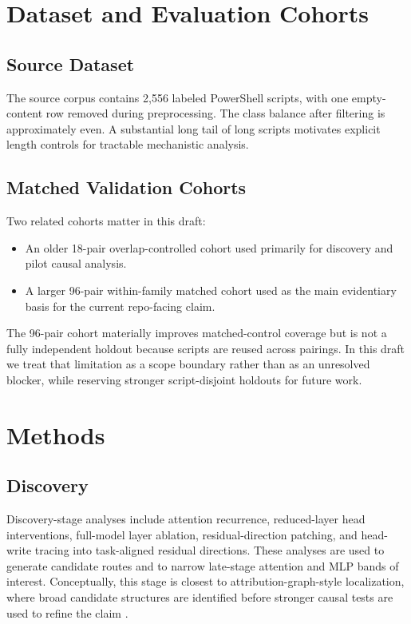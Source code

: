 \documentclass{article}
\begin{document}
\section{Dataset and Evaluation Cohorts}
\subsection{Source Dataset}
The source corpus contains 2{,}556 labeled PowerShell scripts, with one empty-content row removed during preprocessing. The class balance after filtering is approximately even. A substantial long tail of long scripts motivates explicit length controls for tractable mechanistic analysis.

\subsection{Matched Validation Cohorts}
Two related cohorts matter in this draft:
\begin{itemize}[leftmargin=1.5em]
  \item An older 18-pair overlap-controlled cohort used primarily for discovery and pilot causal analysis.
  \item A larger 96-pair within-family matched cohort used as the main evidentiary basis for the current repo-facing claim.
\end{itemize}

The 96-pair cohort materially improves matched-control coverage but is not a fully independent holdout because scripts are reused across pairings. In this draft we treat that limitation as a scope boundary rather than as an unresolved blocker, while reserving stronger script-disjoint holdouts for future work.

\section{Methods}
\subsection{Discovery}
Discovery-stage analyses include attention recurrence, reduced-layer head interventions, full-model layer ablation, residual-direction patching, and head-write tracing into task-aligned residual directions. These analyses are used to generate candidate routes and to narrow late-stage attention and MLP bands of interest. Conceptually, this stage is closest to attribution-graph-style localization, where broad candidate structures are identified before stronger causal tests are used to refine the claim \citep{ameisen2025attributiongraphs}.
\end{document}
